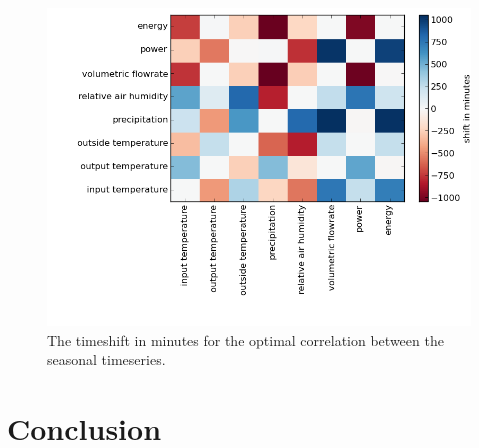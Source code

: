 \documentclass{scrartcl}
\begin{document}
\begin{figure}[H]
  \centering
  \includegraphics[width=0.5\linewidth]{img/timeshift.png}
  \caption{The timeshift in minutes for the optimal correlation between the seasonal timeseries.}
  \label{fig:timeshift}
\end{figure}

\section{Conclusion} 












%



\end{document}
